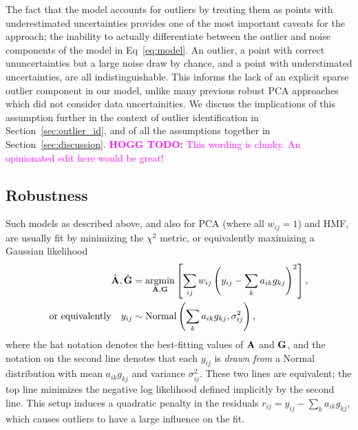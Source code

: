 \documentclass[onecolumn,floatfix]{aastex631}
\DeclareMathOperator*{\argmin}{argmin}
\newcommand{\hoggtodo}[1]{\textcolor{magenta}{\textbf{HOGG TODO:} #1}}
\begin{document}
The fact that the model accounts for outliers by treating them as points with underestimated uncertainties provides one of the most important caveats for the approach; the inability to actually differentiate between the outlier and noise components of the model in Eq~\eqref{eq:model}.
An outlier, a point with correct ununcertainties but a large noise draw by chance, and a point with understimated uncertainties, are all indistinguishable.
This informs the lack of an explicit sparse outlier component in our model, unlike many previous robust PCA approaches \citep[e.g.][]{candes2011} which did not consider data uncertainities.
We discuss the implications of this assumption further in the context of outlier identification in Section~\ref{sec:outlier_id}, and of all the assumptions together in Section~\ref{sec:discussion}.
\hoggtodo{This wording is clunky. An opinionated edit here would be great!}

\subsection{Robustness}

Such models as described above, and also for PCA (where all $w_{ij} = 1$) and HMF, are usually fit by minimizing the $\chi^2$ metric, or equivalently maximizing a Gaussian likelihood
\begin{align}
    \hat{\bf A}, \hat{\bf G} &= \argmin_{{\bf A},{\bf G}} \left[\sum_{ij} w_{ij}\left(y_{ij} - \sum_k a_{ik} g_{kj} \right)^2\right], \\
    {\rm or \,\, equivalently} \quad y_{ij} &\sim {\rm Normal} \left( \sum_k a_{ik} g_{kj}, \sigma^2_{ij}\right),
\end{align}
where the hat notation denotes the best-fitting values of ${\bf A}$ and ${\bf G}$, and the notation on the second line denotes that each $y_{ij}$ is \emph{drawn from} a Normal distribution with mean $a_{ik} g_{kj}$ and variance $\sigma_{ij}^2$.
These two lines are equivalent; the top line minimizes the negative log likelihood defined implicitly by the second line.
This setup induces a quadratic penalty in the residuals $r_{ij} = y_{ij} - \sum_k a_{ik}g_{kj}$, which causes outliers to have a large influence on the fit.
\end{document}
